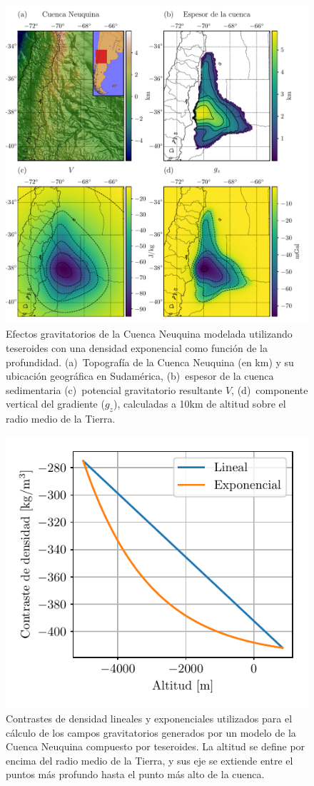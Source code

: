 \begin{figure}
\centering
\includegraphics[width=\linewidth]{figs/tesseroids-variable-density/neuquen-basin.pdf}
\caption{
    Efectos gravitatorios de la Cuenca Neuquina modelada utilizando teseroides
    con una densidad exponencial como función de la profundidad.
    (a)~Topografía de la Cuenca Neuquina (en km) y su ubicación geográfica en
    Sudamérica,
    (b)~espesor de la cuenca sedimentaria \citep[en metros;][]{heine2007}
    (c)~potencial gravitatorio resultante $V$,
    (d)~componente vertical del gradiente ($g_z$),
    calculadas a 10km de altitud sobre el radio medio de la Tierra.
}
\label{fig:neuquen-basin}
\end{figure}

\begin{figure}
\centering
\includegraphics[width=0.5\linewidth]{figs/tesseroids-variable-density/neuquen-basin-densities.pdf}
\caption{
    Contrastes de densidad lineales y exponenciales utilizados para el cálculo
    de los campos gravitatorios generados por un modelo de la Cuenca Neuquina
    compuesto por teseroides.
    La altitud se define por encima del radio medio de la Tierra, y sus eje se
    extiende entre el puntos más profundo hasta el punto más alto de la cuenca.
}
\label{fig:neuquen-basin-densities}
\end{figure}


